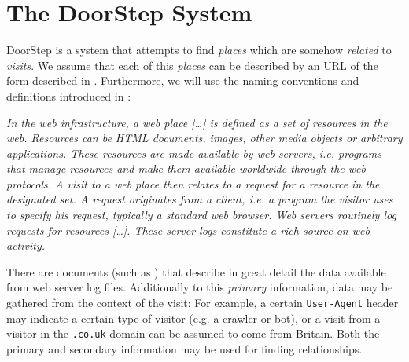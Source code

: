 \documentclass[a4paper]{danarticle}
\begin{document}
  \section{The DoorStep System}
    DoorStep is a system that attempts to find \textit{places} which are somehow
    \textit{related} to \textit{visits}. We assume that each
    of this \textit{places} can be described by an URL of the form described in
    \cite{url}. Furthermore, we will use the naming conventions and definitions
    introduced in \cite{webaware}:
    \begin{center}
    \begin{minipage}{10cm}
    \itshape
    In the web infrastructure, a web place [\dots] is defined as 
    a set of resources in the web. Resources can
    be HTML documents, images, other media objects or arbitrary applications.
    These resources are made available by web servers, i.e. programs that manage
    resources and make them available worldwide through the web protocols. A
    visit to a web place then relates to a request for a resource in the
    designated set. A request originates from a client, i.e. a program the
    visitor uses to specify his request, typically a standard web browser. Web
    servers routinely log requests for resources [\dots]. These server logs
    constitute a rich source on web activity.
    \end{minipage}
    \end{center}
    There are documents (such as \cite{logfile}) that describe in great detail 
    the 
    data available from web server log files. Additionally to
    this \textit{primary} information, data may be gathered from the
    context of the visit: For example, a certain \verb$User-Agent$ header 
    may indicate a certain type of visitor (e.g. a crawler or bot), or a visit
    from a visitor in the \verb$.co.uk$ domain can be assumed to come from
    Britain. Both the primary and secondary information may be used for finding
    relationships.
\end{document}
